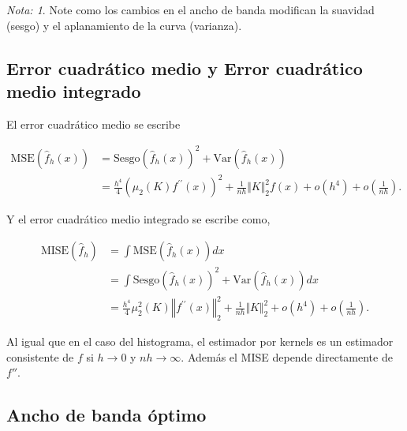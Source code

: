 \documentclass[
  12pt,
]{book}
\theoremstyle{definition}
\theoremstyle{definition}
\theoremstyle{definition}
\theoremstyle{definition}
\theoremstyle{remark}
\newtheorem*{remark}{Nota: }
\begin{document}
\begin{remark}
Note como los cambios en el ancho de banda modifican la suavidad (sesgo) y el aplanamiento de la curva (varianza).
\end{remark}

\hypertarget{error-cuadruxe1tico-medio-y-error-cuadruxe1tico-medio-integrado}{%
\subsection{Error cuadrático medio y Error cuadrático medio integrado}\label{error-cuadruxe1tico-medio-y-error-cuadruxe1tico-medio-integrado}}

El error cuadrático medio se escribe

\begin{align*}
\mathrm{MSE}(\hat{f}_{h}(x))
& = \mathrm{Sesgo}\left(\hat{f}_{h}(x)\right)^{2} + \mathrm{Var}\left(\hat{f}_{h}(x)\right)                                                 \\
& = \frac{h^{4}}{4}\left(\mu_{2}(K)f^{\prime\prime}(x)\right)^{2}+\frac{1}{nh}\Vert K\Vert_{2}^{2}f(x)+o(h^{4})+o\left(\frac{1}{nh}\right).
\end{align*}

Y el error cuadrático medio integrado se escribe como,

\begin{align*}
\mathrm{MISE}\left(\hat{f}_{h}\right) & = \int \mathrm{MSE}\left(\hat{f}_{h}(x)\right)dx                                                                                                        \\
& = \int \mathrm{Sesgo}\left(\hat{f}_{h}(x)\right)^{2} + \mathrm{Var}\left(\hat{f}_{h}(x)\right)dx                                                        \\
& = \frac{h^{4}}{4}\mu_{2}^{2}(K)\left\Vert f^{\prime\prime}(x)\right\Vert_{2}^{2} +\frac{1}{nh}\Vert K\Vert_{2}^{2}+o(h^{4})+o\left(\frac{1}{nh}\right).
\end{align*}

Al igual que en el caso del histograma, el estimador por kernels es un estimador consistente de \(f\) si \(h\rightarrow 0\) y \(nh\rightarrow \infty\). Además el MISE depende directamente de \(f''\).

\hypertarget{ancho-de-banda-uxf3ptimo}{%
\subsection{Ancho de banda óptimo}\label{ancho-de-banda-uxf3ptimo}}
\end{document}
